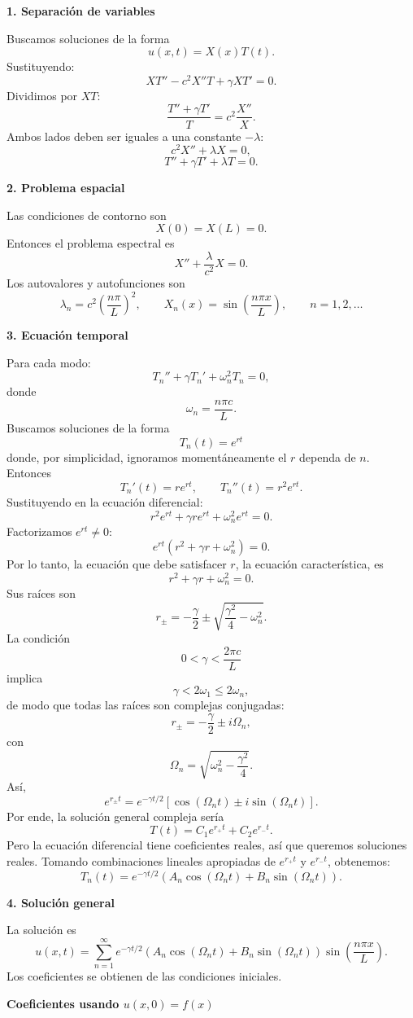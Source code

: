 \documentclass[11pt,spanish]{article}
\newcounter{problema}
\begin{document}
{\bf 1. Separación de variables}

Buscamos soluciones de la forma
$$
u(x,t)=X(x)T(t).
$$
Sustituyendo:
$$
XT''-c^2X''T+\gamma XT'=0.
$$
Dividimos por $XT$:
$$
\frac{T''+\gamma T'}{T}
=
c^2\frac{X''}{X}.
$$
Ambos lados deben ser iguales a una constante $-\lambda$:
$$
c^2X''+\lambda X=0,
$$
$$
T''+\gamma T'+\lambda T=0.
$$

{\bf 2. Problema espacial}

Las condiciones de contorno son
$$
X(0)=X(L)=0.
$$
Entonces el problema espectral es
$$
X''+\frac{\lambda}{c^2}X=0.
$$
Los autovalores y autofunciones son
$$
\lambda_n=c^2\left(\frac{n\pi}{L}\right)^2,
\qquad
X_n(x)=\sin\left(\frac{n\pi x}{L}\right),
\qquad
n=1,2,\dots
$$

{\bf 3. Ecuación temporal}

Para cada modo:
$$
T_n''+\gamma T_n'
+
\omega_n^2T_n=0,
$$
donde
$$
\omega_n=\frac{n\pi c}{L}.
$$
Buscamos soluciones de la forma
$$
T_n(t)=e^{rt}
$$
donde, por simplicidad, ignoramos moment\'aneamente el $r$ dependa de $n$.
Entonces
$$
T_n'(t)=re^{rt},
\qquad
T_n''(t)=r^2e^{rt}.
$$
Sustituyendo en la ecuación diferencial:
$$
r^2e^{rt}
+
\gamma re^{rt}
+
\omega_n^2e^{rt}
=0.
$$
Factorizamos $e^{rt}\neq 0$:
$$
e^{rt}
\left(
r^2+\gamma r+\omega_n^2
\right)=0.
$$
Por lo tanto, la ecuación que debe satisfacer $r$, la ecuaci\'on caracter\'istica, es
$$
r^2+\gamma r+\omega_n^2=0.
$$
Sus raíces son
$$
r_{\pm}
=
-\frac{\gamma}{2}
\pm
\sqrt{
\frac{\gamma^2}{4}-\omega_n^2
}.
$$
La condición
$$
0<\gamma<\frac{2\pi c}{L}
$$
implica
$$
\gamma<2\omega_1\le 2\omega_n,
$$
de modo que todas las raíces son complejas conjugadas:
$$
r_\pm
=
-\frac{\gamma}{2}
\pm
i\Omega_n,
$$
con
$$
\Omega_n
=
\sqrt{
\omega_n^2-\frac{\gamma^2}{4}
}.
$$
Así,
$$
e^{r_\pm t}
=
e^{-\gamma t/2}
\left[
\cos(\Omega_n t)
\pm i\sin(\Omega_n t)
\right].
$$
Por ende, la solución general compleja sería
$$
T(t)
=
C_1e^{r_+ t}
+
C_2e^{r_- t}.
$$
Pero la ecuación diferencial tiene coeficientes reales, así que queremos soluciones reales.
Tomando combinaciones lineales apropiadas de $e^{r_+ t}$ y $e^{r_- t}$, obtenemos:
$$
T_n(t)
=
e^{-\gamma t/2}
\left(
A_n\cos(\Omega_nt)
+
B_n\sin(\Omega_nt)
\right).
$$

{\bf 4. Solución general}

La solución es
$$
u(x,t)
=
\sum_{n=1}^\infty
e^{-\gamma t/2}
\left(
A_n\cos(\Omega_nt)
+
B_n\sin(\Omega_nt)
\right)
\sin\left(\frac{n\pi x}{L}\right).
$$
Los coeficientes se obtienen de las condiciones iniciales.

{\bf Coeficientes usando $u(x,0)=f(x)$}
\end{document}
